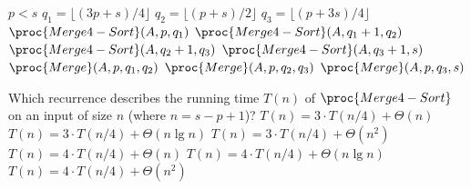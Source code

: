 {\small\begin{codebox}
  \li \If $p<s$ \Do
  \li $q_1 = \lfloor (3p+s)/4\rfloor$
  \li $q_2 = \lfloor (p+s)/2\rfloor$
  \li $q_3 = \lfloor (p+3s)/4\rfloor$
  \li $\proc{Merge4-Sort}(A, p, q_1)$
  \li $\proc{Merge4-Sort}(A, q_1+1, q_2)$
  \li $\proc{Merge4-Sort}(A, q_2+1, q_3)$
  \li $\proc{Merge4-Sort}(A, q_3+1, s)$
  \li $\proc{Merge}(A, p, q_1, q_2)$
  \li $\proc{Merge}(A, p, q_2, q_3)$
  \li $\proc{Merge}(A, p, q_3, s)$ \End
\end{codebox}}

\noindent
Which recurrence describes the running time $T(n)$ of $\proc{Merge4-Sort}$ on an input of size $n$ (where $n=s-p+1$)?
\oneanswer
\optionsstart
\answer $T(n) = 3\cdot T(n/4) + \Theta(n)$
\answer $T(n) = 3\cdot T(n/4) + \Theta(n\lg n)$
\answer $T(n) = 3\cdot T(n/4) + \Theta(n^2)$
\answer $T(n) = 4\cdot T(n/4) + \Theta(n)$ \correct
\answer $T(n) = 4\cdot T(n/4) + \Theta(n\lg n)$
\answer $T(n) = 4\cdot T(n/4) + \Theta(n^2)$
\optionsend
{}

